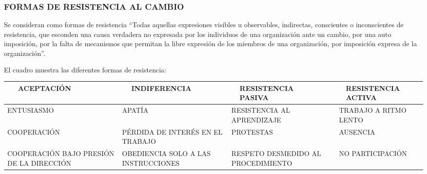 \subsubsection*{FORMAS DE RESISTENCIA AL CAMBIO}
Se consideran como formas de resistencia “Todas aquellas expresiones visibles u observables, indirectas, conscientes o inconscientes de resistencia, que esconden una causa verdadera no expresada por los individuos de una organización ante un cambio, por una auto imposición, por la falta de mecanismos que permitan la libre expresión de los miembros de una organización, por imposición expresa de la organización”.

El cuadro muestra las diferentes formas de resistencia:



\begin{center}
\small
\begin{tabular}{|p{}|p{}|p{}|p{}|p{}|p{}|p{}|p{}|p{}|p{}|p{}|p{}|}
\hline
 & ACEPTACIÓN &  &  & INDIFERENCIA &  &  & RESISTENCIA PASIVA &  &  & RESISTENCIA ACTIVA &  \\ \hline
\multicolumn{3}{|p{\dimexpr0.250\linewidth-2\tabcolsep\relax}|}{ENTUSIASMO} & \multicolumn{3}{|p{\dimexpr0.250\linewidth-2\tabcolsep\relax}|}{APATÍA} & \multicolumn{3}{|p{\dimexpr0.250\linewidth-2\tabcolsep\relax}|}{RESISTENCIA AL APRENDIZAJE} & \multicolumn{3}{|p{\dimexpr0.250\linewidth-2\tabcolsep\relax}|}{TRABAJO A RITMO LENTO} \\ \hline
\multicolumn{3}{|p{\dimexpr0.250\linewidth-2\tabcolsep\relax}|}{COOPERACIÓN} & \multicolumn{3}{|p{\dimexpr0.250\linewidth-2\tabcolsep\relax}|}{PÉRDIDA DE INTERÉS EN EL TRABAJO} & \multicolumn{3}{|p{\dimexpr0.250\linewidth-2\tabcolsep\relax}|}{PROTESTAS} & \multicolumn{3}{|p{\dimexpr0.250\linewidth-2\tabcolsep\relax}|}{AUSENCIA} \\ \hline
\multicolumn{3}{|p{\dimexpr0.250\linewidth-2\tabcolsep\relax}|}{COOPERACIÓN BAJO PRESIÓN DE LA DIRECCIÓN} & \multicolumn{3}{|p{\dimexpr0.250\linewidth-2\tabcolsep\relax}|}{OBEDIENCIA SOLO A LAS INSTRUCCIONES} & \multicolumn{3}{|p{\dimexpr0.250\linewidth-2\tabcolsep\relax}|}{RESPETO DESMEDIDO AL PROCEDIMIENTO} & \multicolumn{3}{|p{\dimexpr0.250\linewidth-2\tabcolsep\relax}|}{NO PARTICIPACIÓN} \\ \hline

\end{tabular}
\end{center}
